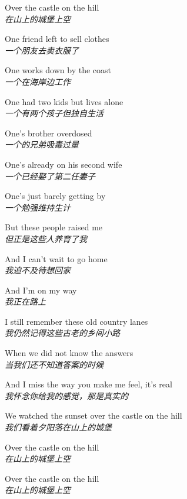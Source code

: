 \begin{spacing}{1.5}
\begin{flushleft}
Over the castle on the hill\\
\textit{在山上的城堡上空}\lyricspace

One friend left to sell clothes\\
\textit{一个朋友去卖衣服了}\lyricspace

One works down by the coast\\
\textit{一个在海岸边工作}\lyricspace

One had two kids but lives alone\\
\textit{一个有两个孩子但独自生活}\lyricspace

One's brother overdosed\\
\textit{一个的兄弟吸毒过量}\lyricspace

One's already on his second wife\\
\textit{一个已经娶了第二任妻子}\lyricspace

One's just barely getting by\\
\textit{一个勉强维持生计}\lyricspace

But these people raised me\\
\textit{但正是这些人养育了我}\lyricspace

And I can't wait to go home\\
\textit{我迫不及待想回家}\lyricspace

And I'm on my way\\
\textit{我正在路上}\lyricspace

I still remember these old country lanes\\
\textit{我仍然记得这些古老的乡间小路}\lyricspace

When we did not know the answers\\
\textit{当我们还不知道答案的时候}\lyricspace

And I miss the way you make me feel, it's real\\
\textit{我怀念你给我的感觉，那是真实的}\lyricspace

We watched the sunset over the castle on the hill\\
\textit{我们看着夕阳落在山上的城堡}\lyricspace

Over the castle on the hill\\
\textit{在山上的城堡上空}\lyricspace

Over the castle on the hill\\
\textit{在山上的城堡上空}\lyricspace
\end{flushleft}
\end{spacing}

